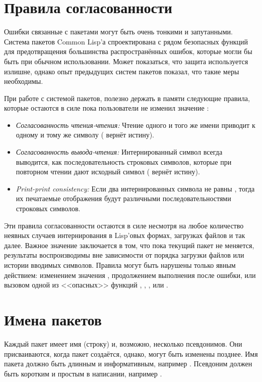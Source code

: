 \section{Правила согласованности}

Ошибки связанные с пакетами могут быть очень тонкими и запутанными. Система
пакетов Common Lisp'а спроектирована с рядом безопасных функций для
предотвращения большинства распространённых ошибок, которые могли бы быть при
обычном использовании. Может показаться, что защита используется излишне,
однако опыт предыдущих систем пакетов показал, что такие меры необходимы.

При работе с системой пакетов, полезно держать в памяти следующие правила,
которые остаются в силе пока пользователи не изменил значение :

\begin{itemize}
\item
\emph{Согласованность чтения-чтения:} Чтение одного и того же имени приводит к
одному и тому же символу ( вернёт истину).

\item
\emph{Согласованность вывода-чтения:} Интернированный символ всегда выводится,
как последовательность строковых символов, которые при повторном чтении дают
исходный символ ( вернёт истину).

\item 
\emph{Print-print consistency:} Если два интернированных символа не равны
, тогда их печатаемые отображения будут различными последовательностями
строковых символов.
\end{itemize}

Эти правила согласованности остаются в силе несмотря на любое количество неявных
случаев интернирования в Lisp'овых формах, загрузках файлов и так далее. Важное
значение заключается в том, что пока текущий пакет не меняется, результаты
воспроизводимы вне зависимости от порядка загрузки файлов или истории вводимых
символов. Правила могут быть нарушены только явным действием: изменением
значения , продолжением выполнения после ошибки, или вызовом
одной из <<опасных>> функций , , ,
 или . 

\section{Имена пакетов}
\label{PACKAGE-NAMES-SECTION}

Каждый пакет имеет имя (строку) и, возможно, несколько псевдонимов. Они
присваиваются, когда пакет создаётся, однако, могут быть изменены
позднее. Имя пакета должно быть длинным и информативным, например
. Псевдоним должен быть коротким и простым в написании, например
.

